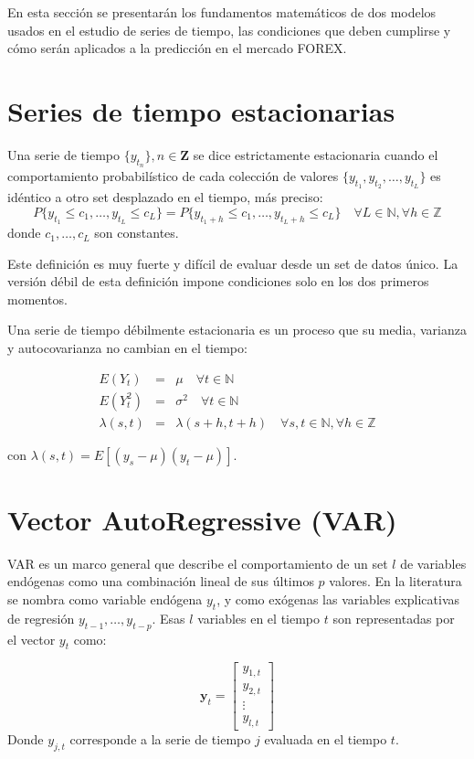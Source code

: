 En esta sección se presentarán los fundamentos matemáticos de dos modelos
usados en el estudio de series de tiempo, las condiciones que deben cumplirse y 
cómo serán aplicados a la predicción en el mercado FOREX. 

\section{Series de tiempo estacionarias}
Una serie de tiempo $\{y_{t_n}\}, n \in \mathbf{Z}$ se dice estrictamente estacionaria
cuando el comportamiento probabilístico de cada colección de valores
$\{y_{t_1},y_{t_2},\dots,y_{t_L}\}$ es idéntico a otro set desplazado en el
tiempo, más preciso: 
\[ P\{y_{t_1} \leq
c_1,\dots,y_{t_L} \leq c_L\} = P\{y_{t_1+h} \leq c_1,\dots,y_{t_L+h}
\leq c_L\}
\quad \forall L \in \mathbb{N}, \forall h \in \mathbb{Z}\] \noindent donde
$c_1,\dots,c_L$ son constantes.

Este definición es muy fuerte y difícil de evaluar desde un set de datos único.
La versión débil de esta definición impone condiciones solo en los dos primeros
momentos.

Una serie de tiempo débilmente estacionaria es un proceso que su media,
varianza y autocovarianza no cambian en el tiempo:

\begin{eqnarray*}
E(Y_t) &=& \mu  \quad \forall t \in \mathbb{N} \\ E(Y^2_t) &=&
\sigma^2  \quad \forall t \in \mathbb{N} \\
\lambda(s,t)&=&\lambda(s+h,t+h) \quad \forall s,t \in \mathbb{N},
\forall h \in \mathbb{Z}
\end{eqnarray*}

\noindent con $\lambda(s,t) = E[(y_s-\mu)(y_t - \mu)]$.

\section{Vector AutoRegressive (VAR)}

VAR es un marco general que describe el comportamiento de un set $l$ de
variables endógenas como una combinación lineal de sus últimos $p$ valores. En
la literatura se nombra como variable endógena $y_t$, y como exógenas las
variables explicativas de regresión $y_{t-1}, \dots, y_{t-p}$.  Esas $l$
variables en el tiempo $t$ son representadas por el vector $y_t$ como:

\begin{equation}
\label{eq:variables}
\mathbf{y}_t = 
\begin{bmatrix} y_{1,t} \\
y_{2,t} \\
\vdots \\
y_{l,t}
\end{bmatrix}
\end{equation}
\noindent Donde $y_{j,t}$ corresponde a la serie de tiempo $j$ evaluada en el
tiempo $t$.


